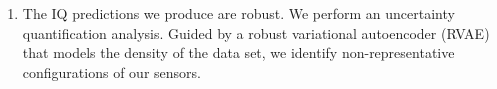 \begin{enumerate}
\item The IQ predictions we produce are robust. We perform an uncertainty quantification analysis.  Guided by a robust variational autoencoder (RVAE) that models the density of the data set, we identify non-representative configurations of our sensors.


\end{enumerate}
